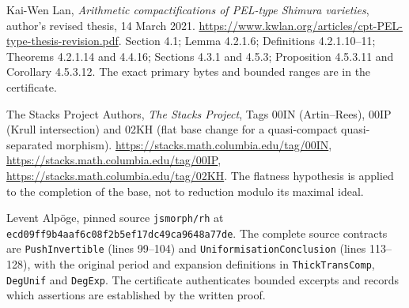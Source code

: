 Kai-Wen Lan, \emph{Arithmetic compactifications of PEL-type Shimura
varieties}, author's revised thesis, 14 March 2021.
\url{https://www.kwlan.org/articles/cpt-PEL-type-thesis-revision.pdf}.
Section 4.1; Lemma 4.2.1.6; Definitions 4.2.1.10--11;
Theorems 4.2.1.14 and 4.4.16; Sections 4.3.1 and 4.5.3;
Proposition 4.5.3.11 and Corollary 4.5.3.12.
The exact primary bytes and bounded ranges are in the certificate.

The Stacks Project Authors, \emph{The Stacks Project},
Tags 00IN (Artin--Rees), 00IP (Krull intersection) and
02KH (flat base change for a quasi-compact quasi-separated morphism).
\url{https://stacks.math.columbia.edu/tag/00IN},
\url{https://stacks.math.columbia.edu/tag/00IP},
\url{https://stacks.math.columbia.edu/tag/02KH}.
The flatness hypothesis is applied to the completion of the base,
not to reduction modulo its maximal ideal.

Levent Alp\"oge, pinned source \texttt{jsmorph/rh} at
\texttt{ecd09ff9b4aaf6c08f2b5ef17dc49ca9648a77de}.
The complete source contracts are \texttt{PushInvertible} (lines 99--104)
and \texttt{UniformisationConclusion} (lines 113--128), with
the original period and expansion definitions in
\texttt{ThickTransComp}, \texttt{DegUnif} and \texttt{DegExp}.
The certificate authenticates bounded excerpts and records which
assertions are established by the written proof.
